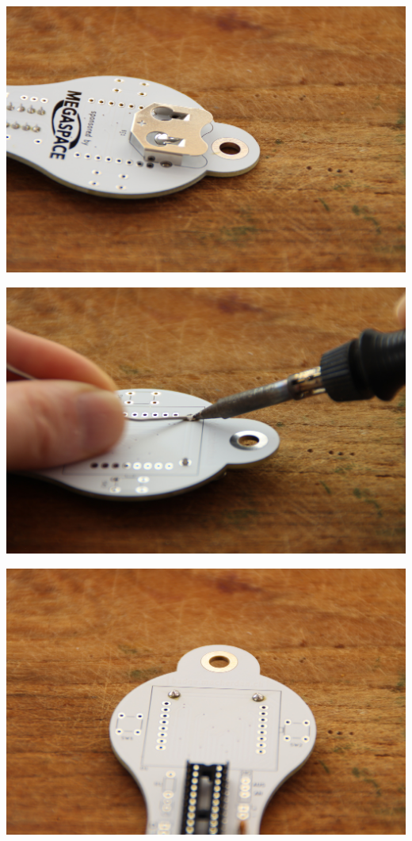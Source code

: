 \documentclass{article}
\begin{document}
\begin{minipage}[b]{0.5\textwidth}
	\includegraphics[width=\textwidth]{Bilder2023/IMG_8363.JPG}
\end{minipage}
\begin{minipage}[b]{0.5\textwidth}
	\includegraphics[width=\textwidth]{Bilder2023/IMG_8364.JPG}
\end{minipage}

\vspace{0.5cm}

\begin{minipage}[b]{0.5\textwidth}
	\includegraphics[width=\textwidth]{Bilder2023/IMG_8365.JPG}
\end{minipage}
\end{document}
